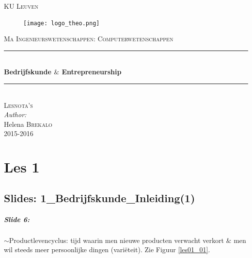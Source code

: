 \documentclass[10pt,a4paper]{report}
\author{Helena Brekalo}
\begin{document}
\begin{titlepage}

\newcommand{\HRule}{\rule{\linewidth}{0.5mm}} %

\center %
 
\textsc{\LARGE KU Leuven}\\[1.5cm] %

\begin{figure}[ht!]
\centering
\texttt{[image: logo\_theo.png]}
\label{kulogo}
\end{figure}

\textsc{\Large Ma Ingenieurswetenschappen: Computerwetenschappen}\\[0.5cm] %


\HRule \\[0.4cm]
{ \huge \bfseries Bedrijfskunde $\&$ Entrepreneurship}\\[0.4cm]
\HRule \\[1.5cm]


\textsc{\Large Lesnota's}\\[0.5cm] %


\large \emph{Author:}\\
Helena \textsc{Brekalo}\\[3cm]

{\large 2015-2016}\\[3cm] %

\vfill %

\end{titlepage}

\tableofcontents
\clearpage

\chapter{Les 1}

\section{Slides: 1\_Bedrijfskunde\_Inleiding(1)}

\paragraph{Slide 6:} $\sim$Productlevencyclus: tijd waarin men nieuwe producten verwacht verkort $\&$ men wil steeds meer persoonlijke dingen (vari\"eteit). Zie Figuur \ref{les01_01}.
\end{document}
